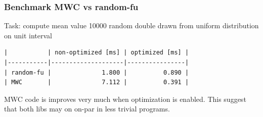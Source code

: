 \documentclass[mathserif, 8pt]{beamer}
\begin{document}
\begin{frame}[standout]
\end{frame}

\begin{frame}[fragile]
  \frametitle{Benchmark MWC vs random-fu}
Task: compute mean value 10000 random double drawn from uniform distribution on
unit interval

\begin{verbatim}
|           | non-optimized [ms] | optimized [ms] |
|-----------|--------------------|----------------|
| random-fu |              1.800 |          0.890 |
| MWC       |              7.112 |          0.391 |
\end{verbatim}

MWC code is improves very much when optimization is
enabled. This suggest that both libs may on on-par
in less trivial programs.
\end{frame}
\end{document}
